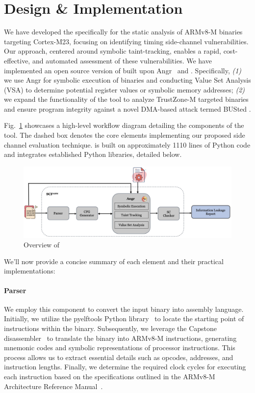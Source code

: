 \section{\tool{} Design \& Implementation}

We have developed the \tool{} specifically for the
static analysis of ARMv8-M binaries targeting Cortex-M23, focusing on
identifying timing side-channel vulnerabilities. Our approach, centered
around symbolic taint-tracking, enables a rapid, cost-effective, and
automated assessment of these vulnerabilities. We have implemented an open
source  version of \tool{} built upon
Angr~\cite{angr} and \tool{} \cite{scfmsp}.
Specifically, \emph{(1)} we use Angr for symbolic execution of binaries and
conducting Value Set Analysis (\ac{VSA}) to determine potential register
values or symbolic memory addresses; \emph{(2)} we expand the functionality of the
\tool{} tool to analyze TrustZone-M targeted binaries
and ensure program integrity against a novel DMA-based attack
termed BUSted \cite{busted}. 

Fig.~\ref{fig:SCFARM} showcases a high-level workflow diagram detailing the
components of the \tool{} tool. The dashed box
denotes the core elements implementing our proposed side channel evaluation
technique. \tool{} is built on approximately 1110
lines of Python code and integrates established Python libraries,
detailed below.

\begin{figure}
  \centering
  \includegraphics[width=.9\textwidth]{figures/SCFARM.jpg}
  \caption{Overview of \tool{}}
  \label{fig:SCFARM}
\end{figure}

We'll now provide a concise summary of each element and their practical
implementations:

\paragraph{\textbf{Parser}}
%
We employ this component to convert the input binary into
assembly language. Initially, we utilize the pyelftools Python
library~\cite{pyelftools} to locate the starting point of instructions
within the binary. Subsequently, we leverage the Capstone
disassembler~\cite{capstone} to translate the binary into ARMv8-M
instructions, generating mnemonic codes and symbolic representations of
processor instructions. This process allows us to extract
essential details such as opcodes, addresses, and instruction lengths.
Finally, we determine the required clock cycles for executing each
instruction based on the specifications outlined in the ARMv8-M
Architecture Reference Manual~\cite{armv8m_ref_manual}.

